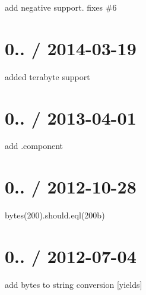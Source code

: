 \begin{DoxyItemize}
\item add negative support. fixes \#6
\end{DoxyItemize}

\section*{0.. / 2014-\/03-\/19 }


\begin{DoxyItemize}
\item added terabyte support
\end{DoxyItemize}

\section*{0.. / 2013-\/04-\/01 }


\begin{DoxyItemize}
\item add .component
\end{DoxyItemize}

\section*{0.. / 2012-\/10-\/28 }


\begin{DoxyItemize}
\item bytes(200).should.\+eql(\textquotesingle{}200b\textquotesingle{})
\end{DoxyItemize}

\section*{0.. / 2012-\/07-\/04 }


\begin{DoxyItemize}
\item add bytes to string conversion \mbox{[}yields\mbox{]} 
\end{DoxyItemize}